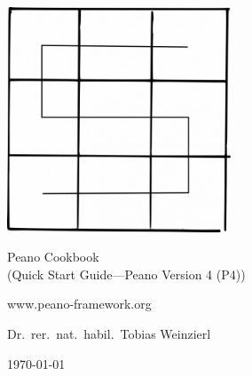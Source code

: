 
\begin{titlepage}

  \begin{center}

    \vspace{8cm}
  
    \includegraphics[width=0.5\textwidth]{../src/Peano-logo.png}
 
    \vspace{1.5cm}

    {\Huge
      Peano Cookbook
    }
    \\
    (Quick Start Guide---Peano Version 4 (P4))
   
    \vspace{1cm}

     www.peano-framework.org
     
    \vspace{1.5cm}

     Dr.~rer.~nat.~habil.~Tobias Weinzierl
 
    \vspace{1.5cm}

    \today
  \end{center}


\end{titlepage}
